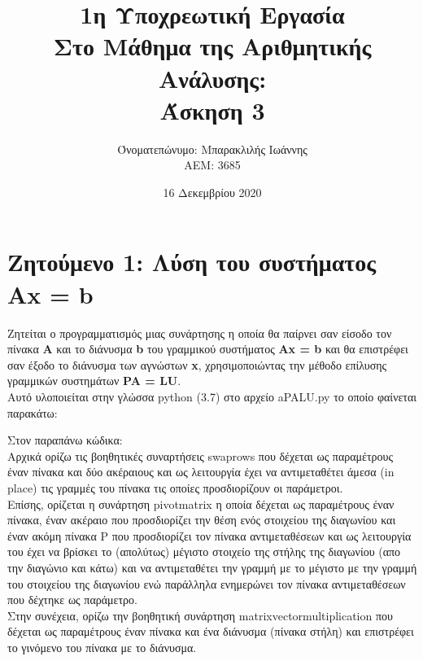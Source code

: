 \documentclass[a4paper,11pt]{article}
\title{1η Υποχρεωτική Εργασία \\ Στο Μάθημα της Αριθμητικής Ανάλυσης: \\ Άσκηση 3}
\author{Όνοματεπώνυμο: Μπαρακλιλής Ιωάννης  \\  ΑΕΜ: 3685}
\date{16 Δεκεμβρίου 2020}
\newcommand{\lt}{\latintext}
\newcommand{\gt}{\greektext}
\begin{document}
\maketitle

\section*{Ζητούμενο 1: Λύση του συστήματος {\lt Ax = b}}
Ζητείται ο προγραμματισμός μιας συνάρτησης η οποία θα παίρνει σαν είσοδο τον πίνακα \textbf{\lt A} και το διάνυσμα \textbf{\lt b} του γραμμικού συστήματος \textbf{\lt Ax = b} και θα επιστρέφει σαν έξοδο το διάνυσμα των αγνώστων \textbf{\lt x}, χρησιμοποιώντας την μέθοδο επίλυσης γραμμικών συστημάτων \textbf{\lt PA = LU}.\\
Αυτό υλοποιείται στην γλώσσα {\lt python} (3.7) στο αρχείο {\lt a\textunderscore PA\textunderscore LU.py} το οποίο φαίνεται παρακάτω:

\lt

\gt

Στον παραπάνω κώδικα:\\
Αρχικά ορίζω τις βοηθητικές συναρτήσεις {\lt swap\textunderscore rows} που δέχεται ως παραμέτρους έναν πίνακα και δύο ακέραιους και ως λειτουργία έχει να αντιμεταθέτει άμεσα ({\lt in place}) τις γραμμές του πίνακα τις οποίες προσδιορίζουν οι παράμετροι.\\
Επίσης, ορίζεται η συνάρτηση {\lt pivot\textunderscore matrix} η οποία δέχεται ως παραμέτρους έναν πίνακα, έναν ακέραιο που προσδιορίζει την θέση ενός στοιχείου της διαγωνίου και έναν ακόμη πίνακα {\lt P} που προσδιορίζει τον πίνακα αντιμεταθέσεων και ως λειτουργία του έχει να βρίσκει το (απολύτως) μέγιστο στοιχείο της στήλης της διαγωνίου (απο την διαγώνιο και κάτω) και να αντιμεταθέτει την γραμμή με το μέγιστο με την γραμμή του στοιχείου της διαγωνίου ενώ παράλληλα ενημερώνει τον πίνακα αντιμεταθέσεων που δέχτηκε ως παράμετρο.\\
Στην συνέχεια, ορίζω την βοηθητική συνάρτηση {\lt matrix\textunderscore vector\textunderscore multiplication} που δέχεται ως παραμέτρους έναν πίνακα και ένα διάνυσμα (πίνακα στήλη) και επιστρέφει το γινόμενο του πίνακα με το διάνυσμα.\\
\end{document}
